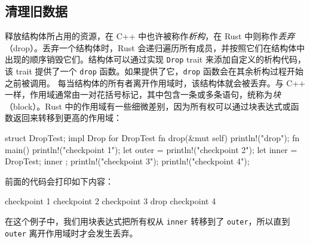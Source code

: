 \subsection{清理旧数据}
\label{idx:idx_56383d94}
释放结构体所占用的资源，在 C++ 中也许被称作\emph{析构}，在 Rust 中则称作\emph{丢弃}（drop）。丢弃一个结构体时，Rust 会递归遍历所有成员，并按照它们在结构体中出现的顺序销毁它们。结构体可以通过实现 \texttt{Drop} trait 来添加自定义的析构代码，该 trait 提供了一个 \texttt{drop} 函数。如果提供了它，\texttt{drop} 函数会在其余析构过程开始之前被调用。
每当结构体的所有者离开作用域时，该结构体就会被丢弃。与 C++ 一样，作用域通常由一对花括号标记，其中包含一条或多条语句，统称为\emph{块}（block）。Rust 中的作用域有一些细微差别，因为所有权可以通过块表达式或函数返回来转移到更高的作用域：
\begin{codebox}[rust]
struct DropTest;
impl Drop for DropTest {
    fn drop(&mut self) {
        println!("drop");
    }
}
fn main() {
    {
        println!("checkpoint 1");
        let outer = {
            println!("checkpoint 2");
            let inner = DropTest;
            inner
        };
        println!("checkpoint 3");
    }
    println!("checkpoint 4");
}
\end{codebox}
\label{idx:idx_7201f6a2}
前面的代码会打印如下内容：
\begin{codeboxdark}
checkpoint 1
checkpoint 2
checkpoint 3
drop
checkpoint 4
\end{codeboxdark}
在这个例子中，我们用块表达式把所有权从 \texttt{inner} 转移到了 \texttt{outer}，所以直到 \texttt{outer} 离开作用域时才会发生丢弃。
